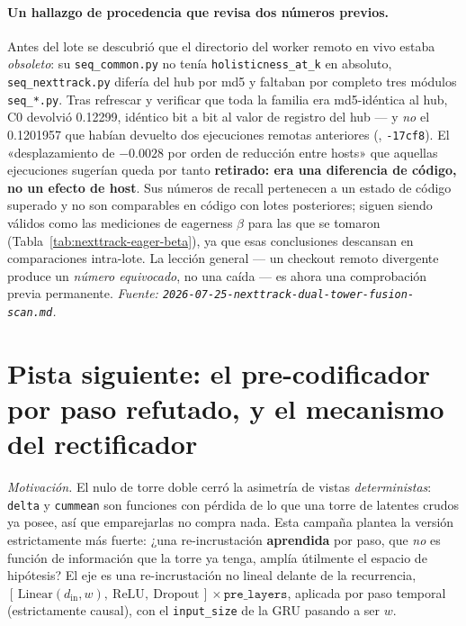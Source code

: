 \documentclass[11pt]{article}
\newcommand{\runid}[1]{\texttt{\small\seqsplit{#1}}}
\begin{document}
\paragraph{Un hallazgo de procedencia que revisa dos números previos.} Antes del
lote se descubrió que el directorio del worker remoto en vivo estaba
\emph{obsoleto}: su \texttt{seq\_common.py} no tenía \texttt{holisticness\_at\_k}
en absoluto, \texttt{seq\_nexttrack.py} difería del hub por md5 y faltaban por
completo tres módulos \texttt{seq\_*.py}. Tras refrescar y verificar que toda la
familia era md5-idéntica al hub, C0 devolvió \num{0.12299}, idéntico bit a bit al
valor de registro del hub --- y \emph{no} el \num{0.1201957} que habían devuelto
dos ejecuciones remotas anteriores (\runid{run-20260723-002044-af11a},
\texttt{-17cf8}). El «desplazamiento de $-\num{0.0028}$ por orden de reducción
entre hosts» que aquellas ejecuciones sugerían queda por tanto
\textbf{retirado: era una diferencia de código, no un efecto de host}. Sus
números de recall pertenecen a un estado de código superado y no son comparables
en código con lotes posteriores; siguen siendo válidos como las mediciones de
eagerness $\beta$ para las que se tomaron (Tabla~\ref{tab:nexttrack-eager-beta}), ya que
esas conclusiones descansan en comparaciones intra-lote. La lección general ---
un checkout remoto divergente produce un \emph{número equivocado}, no una caída
--- es ahora una comprobación previa permanente.
\emph{Fuente: \texttt{2026-07-25-nexttrack-dual-tower-fusion-scan.md}.}

\section{Pista siguiente: el pre-codificador por paso refutado, y el mecanismo del rectificador}
\label{sec:nexttrack-preencoder}
\emph{Motivación.} El nulo de torre doble cerró la asimetría de vistas
\emph{deterministas}: \texttt{delta} y \texttt{cummean} son funciones con pérdida
de lo que una torre de latentes crudos ya posee, así que emparejarlas no compra
nada. Esta campaña plantea la versión estrictamente más fuerte: ¿una
re-incrustación \textbf{aprendida} por paso, que \emph{no} es función de
información que la torre ya tenga, amplía útilmente el espacio de hipótesis? El
eje es una re-incrustación no lineal delante de la recurrencia,
$[\,\text{Linear}(d_{\text{in}},w),\ \text{ReLU},\ \text{Dropout}\,]\times
\texttt{pre\_layers}$, aplicada por paso temporal (estrictamente causal), con el
\texttt{input\_size} de la GRU pasando a ser $w$.
\end{document}
